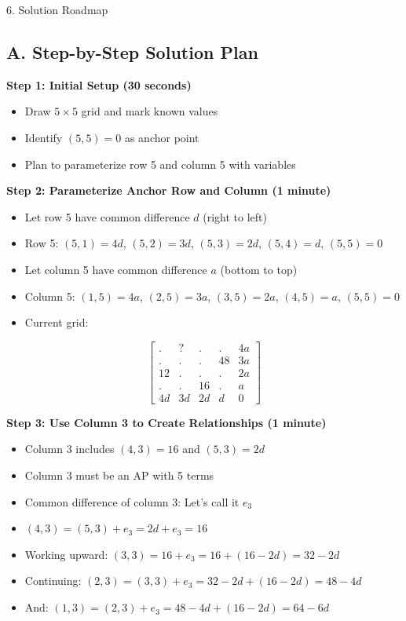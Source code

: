\documentclass[12pt]{article}
\begin{document}
\begin{roadmapbox}{6. Solution Roadmap}

\subsection*{A. Step-by-Step Solution Plan}

\textbf{Step 1: Initial Setup (30 seconds)}
\begin{itemize}
    \item Draw $5 \times 5$ grid and mark known values
    \item Identify $(5,5) = 0$ as anchor point
    \item Plan to parameterize row 5 and column 5 with variables
\end{itemize}

\textbf{Step 2: Parameterize Anchor Row and Column (1 minute)}
\begin{itemize}
    \item Let row 5 have common difference $d$ (right to left)
    \item Row 5: $(5,1) = 4d$, $(5,2) = 3d$, $(5,3) = 2d$, $(5,4) = d$, $(5,5) = 0$
    \item Let column 5 have common difference $a$ (bottom to top)
    \item Column 5: $(1,5) = 4a$, $(2,5) = 3a$, $(3,5) = 2a$, $(4,5) = a$, $(5,5) = 0$
    \item Current grid:
\end{itemize}

\[\begin{bmatrix} . & ? &.&.&4a \\ .&.&.&48&3a\\ 12&.&.&.&2a\\ .&.&16&.&a\\ 4d&3d&2d&d&0\end{bmatrix}\]

\textbf{Step 3: Use Column 3 to Create Relationships (1 minute)}
\begin{itemize}
    \item Column 3 includes $(4,3) = 16$ and $(5,3) = 2d$
    \item Column 3 must be an AP with 5 terms
    \item Common difference of column 3: Let's call it $e_3$
    \item $(4,3) = (5,3) + e_3 = 2d + e_3 = 16$
    \item Working upward: $(3,3) = 16 + e_3 = 16 + (16 - 2d) = 32 - 2d$
    \item Continuing: $(2,3) = (3,3) + e_3 = 32 - 2d + (16 - 2d) = 48 - 4d$
    \item And: $(1,3) = (2,3) + e_3 = 48 - 4d + (16 - 2d) = 64 - 6d$
\end{itemize}


\end{roadmapbox}
\end{document}
